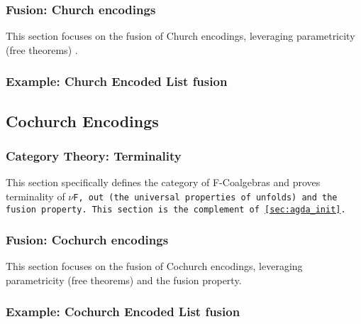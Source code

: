 \subsubsection{Fusion: Church encodings}
This section focuses on the fusion of Church encodings, leveraging parametricity (free theorems) \citep{Wadler1989}.


\subsubsection{Example: Church Encoded List fusion}\label{sec:agda_church_list}


% 


\subsection{Cochurch Encodings}
\subsubsection{Category Theory: Terminality}
This section specifically defines the category of F-Coalgebras and proves terminality of \tt{$\nu$F, out} (the universal properties of unfolds) and the fusion property.
This section is the complement of \autoref{sec:agda_init}.



\subsubsection{Fusion: Cochurch encodings}
This section focuses on the fusion of Cochurch encodings, leveraging parametricity (free theorems) and the fusion property.


\subsubsection{Example: Cochurch Encoded List fusion}




